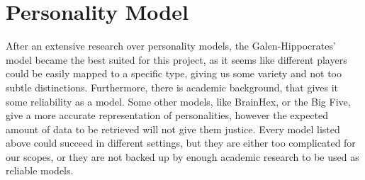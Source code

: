\section{Personality Model}\label{sec:persmodme}
After an extensive research over personality models, the Galen-Hippocrates' model became the best suited for this project, as it seems like different players could be easily mapped to a specific type, giving us some variety and not too subtle distinctions. Furthermore, there is academic background, that gives it some reliability as a model.
Some other models, like BrainHex, or the Big Five, give a more accurate representation of personalities, however the expected amount of data to be retrieved will not give them justice.
Every model listed above could succeed in different settings, but they are either too complicated for our scopes, or they are not backed up by enough academic research to be used as reliable models.
